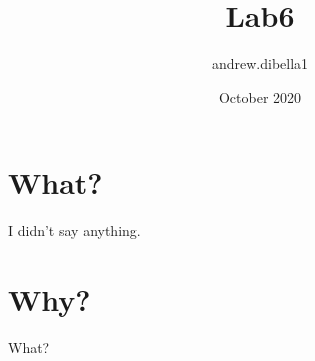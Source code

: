 \documentclass{article}
\title{Lab6}
\author{andrew.dibella1 }
\date{October 2020}
\begin{document}
\maketitle

\section{What?}
I didn't say anything.
\section{Why?}
What?
\end{document}
